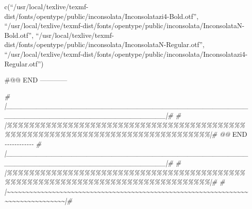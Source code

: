 \documentclass[
]{article}
\newenvironment{Shaded}{\begin{snugshade}}{\end{snugshade}}
\newcommand{\CommentTok}[1]{\textcolor[rgb]{0.56,0.35,0.01}{\textit{#1}}}
\newcommand{\RegionMarkerTok}[1]{#1}
\begin{document}
c(``/usr/local/texlive/texmf-dist/fonts/opentype/public/inconsolata/Inconsolatazi4-Bold.otf'',
``/usr/local/texlive/texmf-dist/fonts/opentype/public/inconsolata/InconsolataN-Bold.otf'',
``/usr/local/texlive/texmf-dist/fonts/opentype/public/inconsolata/InconsolataN-Regular.otf'',
``/usr/local/texlive/texmf-dist/fonts/opentype/public/inconsolata/Inconsolatazi4-Regular.otf'')

\#@@ END ------------

\begin{Shaded}
\begin{Highlighting}[]
\CommentTok{\# |\_\_\_\_\_\_\_\_\_\_\_\_\_\_\_\_\_\_\_\_\_\_\_\_\_\_\_\_\_\_\_\_\_\_\_\_\_\_\_\_\_\_\_\_\_\_\_\_\_\_\_\_\_\_\_\_\_\_\_\_\_\_\_\_\_\_\_\_\_\_\_\_\_\_\_\_\_\_\_\_|\#}
\CommentTok{\# |\%\%\%\%\%\%\%\%\%\%\%\%\%\%\%\%\%\%\%\%\%\%\%\%\%\%\%\%\%\%\%\%\%\%\%\%\%\%\%\%\%\%\%\%\%\%\%\%\%\%\%\%\%\%\%\%\%\%\%\%\%\%\%\%\%\%\%\%\%\%\%\%\%\%\%\%\%\%\%\%|\# @@ }\RegionMarkerTok{END}\CommentTok{ {-}{-}{-}{-}{-}{-}{-}{-}{-}{-}{-}{-}}
\CommentTok{\# |\_\_\_\_\_\_\_\_\_\_\_\_\_\_\_\_\_\_\_\_\_\_\_\_\_\_\_\_\_\_\_\_\_\_\_\_\_\_\_\_\_\_\_\_\_\_\_\_\_\_\_\_\_\_\_\_\_\_\_\_\_\_\_\_\_\_\_\_\_\_\_\_\_\_\_\_\_\_\_\_|\#}
\CommentTok{\# |\%\%\%\%\%\%\%\%\%\%\%\%\%\%\%\%\%\%\%\%\%\%\%\%\%\%\%\%\%\%\%\%\%\%\%\%\%\%\%\%\%\%\%\%\%\%\%\%\%\%\%\%\%\%\%\%\%\%\%\%\%\%\%\%\%\%\%\%\%\%\%\%\%\%\%\%\%\%\%\%|\#}
\CommentTok{\# |\textasciitilde{}\textasciitilde{}\textasciitilde{}\textasciitilde{}\textasciitilde{}\textasciitilde{}\textasciitilde{}\textasciitilde{}\textasciitilde{}\textasciitilde{}\textasciitilde{}\textasciitilde{}\textasciitilde{}\textasciitilde{}\textasciitilde{}\textasciitilde{}\textasciitilde{}\textasciitilde{}\textasciitilde{}\textasciitilde{}\textasciitilde{}\textasciitilde{}\textasciitilde{}\textasciitilde{}\textasciitilde{}\textasciitilde{}\textasciitilde{}\textasciitilde{}\textasciitilde{}\textasciitilde{}\textasciitilde{}\textasciitilde{}\textasciitilde{}\textasciitilde{}\textasciitilde{}\textasciitilde{}\textasciitilde{}\textasciitilde{}\textasciitilde{}\textasciitilde{}\textasciitilde{}\textasciitilde{}\textasciitilde{}\textasciitilde{}\textasciitilde{}\textasciitilde{}\textasciitilde{}\textasciitilde{}\textasciitilde{}\textasciitilde{}\textasciitilde{}\textasciitilde{}\textasciitilde{}\textasciitilde{}\textasciitilde{}\textasciitilde{}\textasciitilde{}\textasciitilde{}\textasciitilde{}\textasciitilde{}\textasciitilde{}\textasciitilde{}\textasciitilde{}\textasciitilde{}\textasciitilde{}\textasciitilde{}\textasciitilde{}\textasciitilde{}\textasciitilde{}\textasciitilde{}\textasciitilde{}\textasciitilde{}\textasciitilde{}\textasciitilde{}\textasciitilde{}\textasciitilde{}\textasciitilde{}\textasciitilde{}\textasciitilde{}\textasciitilde{}|\#}

\end{Highlighting}
\end{Shaded}
\end{document}

